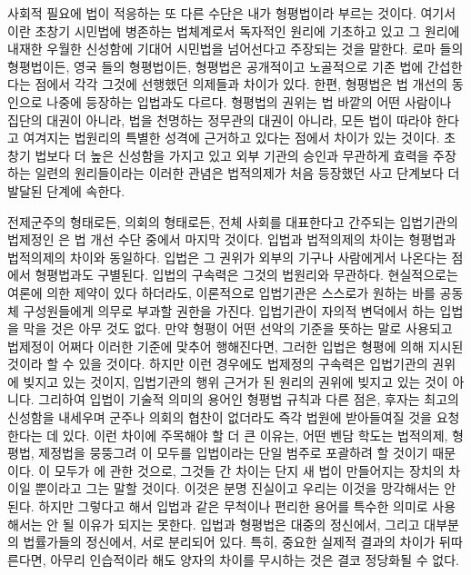 사회적 필요에 법이 적응하는 또 다른 수단은 내가 형평법이라 부르는 것이다.
여기서 이란 초창기 시민법에 병존하는 법체계로서
독자적인 원리에 기초하고 있고 그 원리에 내재한 우월한 신성함에 기대어
시민법을 넘어선다고 주장되는 것을 말한다.
로마 들의 형평법이든,
영국 들의 형평법이든,
형평법은
공개적이고 노골적으로 기존 법에 간섭한다는 점에서
각각 그것에 선행했던 의제들과 차이가 있다.
한편, 형평법은 법 개선의 동인으로 나중에 등장하는 입법과도 다르다.
형평법의 권위는
법 바깥의 어떤 사람이나 집단의 대권이 아니라,
법을 천명하는 정무관의 대권이 아니라,
모든 법이 따라야 한다고 여겨지는 법원리의 특별한 성격에
근거하고 있다는 점에서 차이가 있는 것이다.
초창기 법보다 더 높은 신성함을 가지고 있고
외부 기관의 승인과 무관하게 효력을 주장하는
일련의 원리들이라는 이러한 관념은
법적의제가 처음 등장했던 사고 단계보다 더 발달된 단계에 속한다.

전제군주의 형태로든, 의회의 형태로든,
전체 사회를 대표한다고 간주되는 입법기관의 법제정인 은
법 개선 수단 중에서 마지막 것이다.
입법과 법적의제의 차이는 형평법과 법적의제의 차이와 동일하다.
입법은
그 권위가 외부의 기구나 사람에게서 나온다는 점에서
형평법과도 구별된다.
입법의 구속력은 그것의 법원리와 무관하다.
현실적으로는 여론에 의한 제약이 있다 하더라도,
이론적으로 입법기관은 스스로가 원하는 바를 공동체 구성원들에게
의무로 부과할 권한을 가진다.
입법기관이 자의적 변덕에서 하는 입법을 막을 것은 아무 것도 없다.
만약 형평이 어떤 선악의 기준을 뜻하는 말로 사용되고
법제정이 어쩌다 이러한 기준에 맞추어 행해진다면,
그러한 입법은 형평에 의해 지시된 것이라 할 수 있을 것이다.
하지만 이런 경우에도 법제정의 구속력은 입법기관의 권위에 빚지고 있는 것이지,
입법기관의 행위 근거가 된 원리의 권위에 빚지고 있는 것이 아니다.
그리하여 입법이 기술적 의미의 용어인 형평법 규칙과 다른 점은,
후자는 최고의 신성함을 내세우며 군주나 의회의 협찬이 없더라도
즉각 법원에 받아들여질 것을 요청한다는 데 있다.
이런 차이에 주목해야 할 더 큰 이유는,
어떤 벤담 학도는 법적의제, 형평법, 제정법을 뭉뚱그려
이 모두를 입법이라는 단일 범주로 포괄하려 할 것이기 때문이다.
이 모두가 에 관한 것으로,
그것들 간 차이는 단지 새 법이 만들어지는 장치의 차이일 뿐이라고 그는
말할 것이다.
이것은 분명 진실이고 우리는 이것을 망각해서는 안 된다.
하지만 그렇다고 해서 입법과 같은 무척이나 편리한 용어를
특수한 의미로 사용해서는 안 될 이유가 되지는 못한다.
입법과 형평법은 대중의 정신에서, 그리고 대부분의 법률가들의 정신에서,
서로 분리되어 있다.
특히, 중요한 실제적 결과의 차이가 뒤따른다면,
아무리 인습적이라 해도 양자의 차이를 무시하는 것은 결코 정당화될 수 없다.

